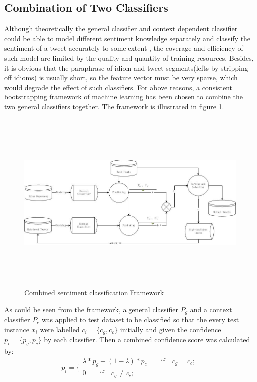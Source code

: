 \documentclass{llncs}
\begin{document}
\subsection{Combination of Two Classifiers}
Although theoretically the general classifier and context dependent classifier could be able to model different sentiment knowledge separately and classify the sentiment of a tweet accurately to some extent , 
the coverage and efficiency of such model are limited by the quality and quantity of training resources. 
Besides, it is obvious that the paraphrase of idiom and tweet segments(lefts by stripping off idioms) is usually short, so the feature vector must be very sparse, which would degrade the effect of such classifiers. 
For above reasons, a consistent bootstrapping framework of machine learning has been chosen to combine the two general classifiers together. 
The framework is illustrated in figure 1. 
\begin{figure} 
\centering%
\includegraphics[width=5.5in,height=3.5in]{itse13.jpg}
\caption{Combined sentiment classification Framework}
\label{fig:graph}
\end{figure}
As could be seen from the framework, a general classifier $ P_{g} $ and a context classifier $ P_{c} $ was applied to test dataset to be classified so that the every test instance $ x_{i} $ were labelled $ c_{i}=\lbrace c_{g},c_{c}\rbrace $ initially and given the confidence $ p_{i}= \lbrace p_{g},p_{c}\rbrace$ by each classifier. 
Then a combined confidence score was calculated by:
\begin{equation}
p_{i}=\lbrace
\begin{array}{rcl}
\lambda\ast p_{g} + \left( 1-\lambda \right) \ast p_{c} \qquad \mathrm{if} \quad c_{g}=c_{c};\\
0 \qquad \mathrm{if} \quad c_{g} \neq c_{c};
\end{array}
\end{equation}
\end{document}
